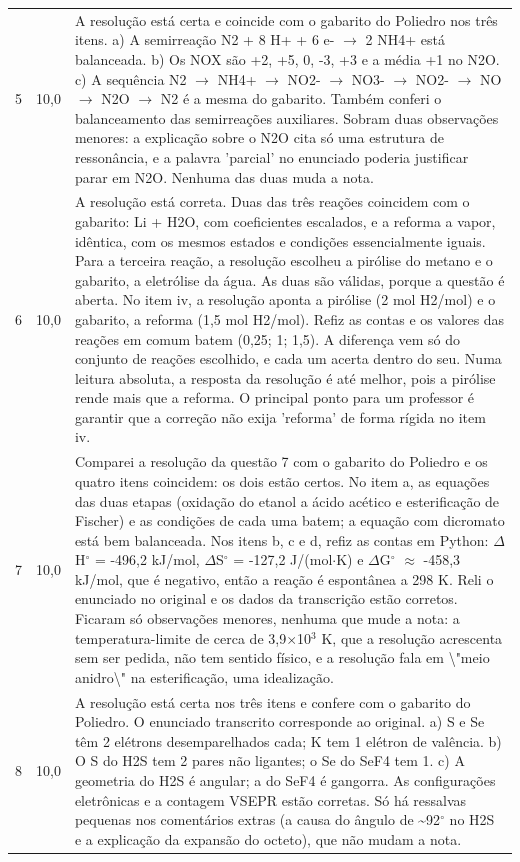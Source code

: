 \documentclass{article}%
\begin{document}
\begin{longtable}{@{}c c p{}@{}}
5 & 10,0 & A resolução está certa e coincide com o gabarito do Poliedro nos três itens. a) A semirreação N2 + 8 H+ + 6 e- $\to$ 2 NH4+ está balanceada. b) Os NOX são +2, +5, 0, -3, +3 e a média +1 no N2O. c) A sequência N2 $\to$ NH4+ $\to$ NO2- $\to$ NO3- $\to$ NO2- $\to$ NO $\to$ N2O $\to$ N2 é a mesma do gabarito. Também conferi o balanceamento das semirreações auxiliares. Sobram duas observações menores: a explicação sobre o N2O cita só uma estrutura de ressonância, e a palavra 'parcial' no enunciado poderia justificar parar em N2O. Nenhuma das duas muda a nota. \\
6 & 10,0 & A resolução está correta. Duas das três reações coincidem com o gabarito: Li + H2O, com coeficientes escalados, e a reforma a vapor, idêntica, com os mesmos estados e condições essencialmente iguais. Para a terceira reação, a resolução escolheu a pirólise do metano e o gabarito, a eletrólise da água. As duas são válidas, porque a questão é aberta. No item iv, a resolução aponta a pirólise (2 mol H2/mol) e o gabarito, a reforma (1,5 mol H2/mol). Refiz as contas e os valores das reações em comum batem (0,25; 1; 1,5). A diferença vem só do conjunto de reações escolhido, e cada um acerta dentro do seu. Numa leitura absoluta, a resposta da resolução é até melhor, pois a pirólise rende mais que a reforma. O principal ponto para um professor é garantir que a correção não exija 'reforma' de forma rígida no item iv. \\
7 & 10,0 & Comparei a resolução da questão 7 com o gabarito do Poliedro e os quatro itens coincidem: os dois estão certos. No item a, as equações das duas etapas (oxidação do etanol a ácido acético e esterificação de Fischer) e as condições de cada uma batem; a equação com dicromato está bem balanceada. Nos itens b, c e d, refiz as contas em Python: $\Delta$H$^\circ$ = -496,2 kJ/mol, $\Delta$S$^\circ$ = -127,2 J/(mol$\cdot$K) e $\Delta$G$^\circ$ $\approx$ -458,3 kJ/mol, que é negativo, então a reação é espontânea a 298 K. Reli o enunciado no original e os dados da transcrição estão corretos. Ficaram só observações menores, nenhuma que mude a nota: a temperatura{-}limite de cerca de 3,9$\times$10$^3$ K, que a resolução acrescenta sem ser pedida, não tem sentido físico, e a resolução fala em \textbackslash{}"meio anidro\textbackslash{}" na esterificação, uma idealização. \\
8 & 10,0 & A resolução está certa nos três itens e confere com o gabarito do Poliedro. O enunciado transcrito corresponde ao original. a) S e Se têm 2 elétrons desemparelhados cada; K tem 1 elétron de valência. b) O S do H2S tem 2 pares não ligantes; o Se do SeF4 tem 1. c) A geometria do H2S é angular; a do SeF4 é gangorra. As configurações eletrônicas e a contagem VSEPR estão corretas. Só há ressalvas pequenas nos comentários extras (a causa do ângulo de \textasciitilde{}92$^\circ$ no H2S e a explicação da expansão do octeto), que não mudam a nota. \\

\end{longtable}
\end{document}

